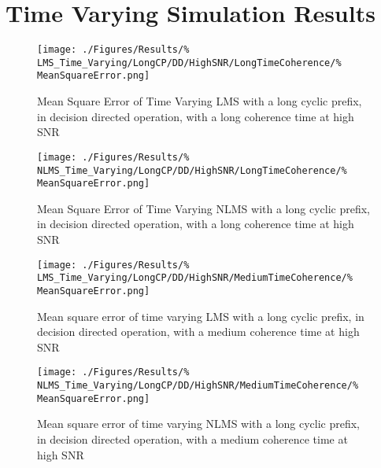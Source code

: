 \section{Time Varying Simulation Results}
\label{sec:TVResults}
\begin{figure}[ht]
	\centering
	\begin{minipage}{0.49\textwidth}
		\centering
		\texttt{[image: ./Figures/Results/\%
	LMS\_Time\_Varying/LongCP/DD/HighSNR/LongTimeCoherence/\%
	MeanSquareError.png]}
		\captionsetup{width=0.75\linewidth}
		\caption{Mean Square Error of Time Varying LMS with 
		a long cyclic prefix, in decision directed operation,
		with a long coherence time at high SNR}
	\end{minipage}
	\begin{minipage}{0.49\textwidth}
		\centering
		\texttt{[image: ./Figures/Results/\%
	NLMS\_Time\_Varying/LongCP/DD/HighSNR/LongTimeCoherence/\%
	MeanSquareError.png]}
		\captionsetup{width=0.75\linewidth}
		\caption{Mean Square Error of Time Varying NLMS with 
		a long cyclic prefix, in decision directed operation,
		with a long coherence time at high SNR}
	\end{minipage}
\end{figure}
\begin{figure}[ht]
	\centering
	\begin{minipage}{0.49\textwidth}
		\centering
		\texttt{[image: ./Figures/Results/\%
	LMS\_Time\_Varying/LongCP/DD/HighSNR/MediumTimeCoherence/\%
	MeanSquareError.png]}
		\captionsetup{width=0.75\linewidth}
		\caption{Mean square error of time varying LMS with a 
		long cyclic prefix, in decision directed operation, 
		with a medium coherence time at high SNR}
		\label{fig:Medium-High-Directed-Long}
	\end{minipage}
	\begin{minipage}{0.49\textwidth}
		\centering
		\texttt{[image: ./Figures/Results/\%
	NLMS\_Time\_Varying/LongCP/DD/HighSNR/MediumTimeCoherence/\%
	MeanSquareError.png]}
		\captionsetup{width=0.75\linewidth}
		\caption{Mean square error of time varying NLMS with 
		a long cyclic prefix, in decision directed operation, 
		with a medium coherence time at high SNR}
	\end{minipage}
\end{figure}

